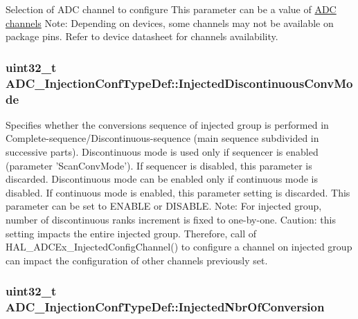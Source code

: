 Selection of A\-D\-C channel to configure This parameter can be a value of \hyperlink{group___a_d_c__channels}{A\-D\-C channels} Note\-: Depending on devices, some channels may not be available on package pins. Refer to device datasheet for channels availability. \hypertarget{struct_a_d_c___injection_conf_type_def_adf871acec9ab869d14b5d58e1549739b}{
\subsubsection[{Injected\-Discontinuous\-Conv\-Mode}]{\setlength{\rightskip}{0pt plus 5cm}uint32\-\_\-t A\-D\-C\-\_\-\-Injection\-Conf\-Type\-Def\-::\-Injected\-Discontinuous\-Conv\-Mode}}\label{struct_a_d_c___injection_conf_type_def_adf871acec9ab869d14b5d58e1549739b}
Specifies whether the conversions sequence of injected group is performed in Complete-\/sequence/\-Discontinuous-\/sequence (main sequence subdivided in successive parts). Discontinuous mode is used only if sequencer is enabled (parameter 'Scan\-Conv\-Mode'). If sequencer is disabled, this parameter is discarded. Discontinuous mode can be enabled only if continuous mode is disabled. If continuous mode is enabled, this parameter setting is discarded. This parameter can be set to E\-N\-A\-B\-L\-E or D\-I\-S\-A\-B\-L\-E. Note\-: For injected group, number of discontinuous ranks increment is fixed to one-\/by-\/one. Caution\-: this setting impacts the entire injected group. Therefore, call of H\-A\-L\-\_\-\-A\-D\-C\-Ex\-\_\-\-Injected\-Config\-Channel() to configure a channel on injected group can impact the configuration of other channels previously set. \hypertarget{struct_a_d_c___injection_conf_type_def_ac59f9795b1b8c4ce6745d99f8231b768}{
\subsubsection[{Injected\-Nbr\-Of\-Conversion}]{\setlength{\rightskip}{0pt plus 5cm}uint32\-\_\-t A\-D\-C\-\_\-\-Injection\-Conf\-Type\-Def\-::\-Injected\-Nbr\-Of\-Conversion}}\label{struct_a_d_c___injection_conf_type_def_ac59f9795b1b8c4ce6745d99f8231b768}
